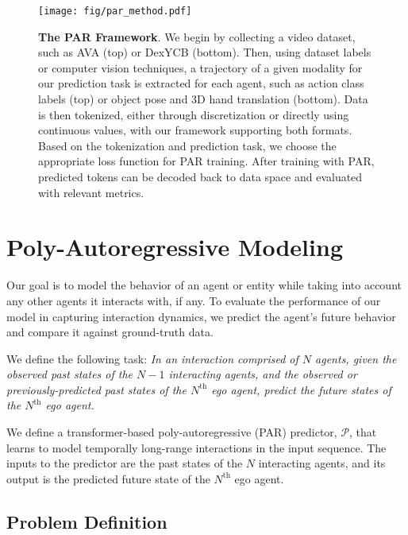 
\begin{figure*}
\centering
    \texttt{[image: fig/par\_method.pdf]}  
    \caption{\textbf{The PAR Framework}. We begin by collecting a video dataset, such as AVA (top) or DexYCB (bottom). Then, using dataset labels or computer vision techniques, a trajectory of a given modality for our prediction task is extracted for each agent, such as action class labels (top) or object pose and 3D hand translation (bottom). Data is then tokenized, either through discretization or directly using continuous values, with our framework supporting both formats. Based on the tokenization and prediction task, we choose the appropriate loss function for PAR training. After training with PAR, predicted tokens can be decoded back to data space and evaluated with relevant metrics.}
    \label{fig:PAR_pipeline}
\vspace{-1em}
\end{figure*}

\section{Poly-Autoregressive Modeling}

Our goal is to model the behavior of an agent or entity while taking into account any other agents it interacts  with, if any. To evaluate the performance of our model in capturing interaction dynamics, we predict the agent's future behavior and compare it against ground-truth data. 

We define the following task: \textit{In an interaction comprised of $N$ agents, given the observed past states of the $N-1$ interacting agents, and the observed or previously-predicted past states of the $N^{\text{th}}$ ego agent, predict the future states of the $N^{\text{th}}$  ego agent.}

We define a transformer-based poly-autoregressive (PAR) predictor, $\mathcal{P}$, that learns to model temporally long-range interactions in the input sequence. The inputs to the predictor are the past states of the $N$ interacting agents, and its output is the predicted future state of the $N^{\text{th}}$ ego agent.

\subsection{Problem Definition}
\label{sec:prob_def}

